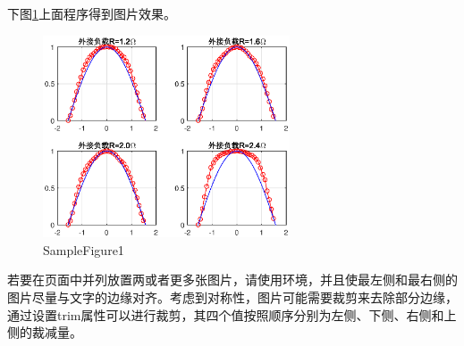 {\begin{spacing}{1.5}
下图\ref{samplefigure1}上面程序得到图片效果。

\begin{figure}[htbp]
  \centering
  \includegraphics[width=0.65\textwidth, trim=0 20 0 0,clip]{figure//fig_calculate}
  \caption{SampleFigure1}\label{samplefigure1}
\end{figure}

\newpage
若要在页面中并列放置两或者更多张图片，请使用环境，并且使最左侧和最右侧的图片尽量与文字的边缘对齐。考虑到对称性，图片可能需要裁剪来去除部分边缘，通过设置trim属性可以进行裁剪，其四个值按照顺序分别为左侧、下侧、右侧和上侧的裁减量。


\end{spacing}}
